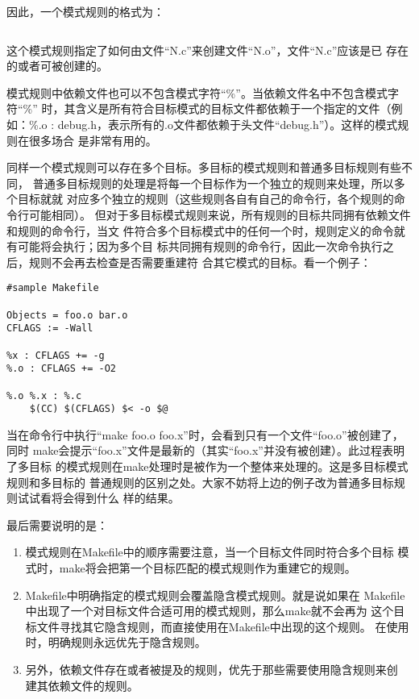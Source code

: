 因此，一个模式规则的格式为：

\begin{Verbatim}[]
%.o : %.c ; COMMAND...
\end{Verbatim}
\noindent 这个模式规则指定了如何由文件“N.c”来创建文件“N.o”，文件“N.c”应该是已
存在的或者可被创建的。

模式规则中依赖文件也可以不包含模式字符“\%”。当依赖文件名中不包含模式字符“\%”
时，其含义是所有符合目标模式的目标文件都依赖于一个指定的文件（例如：\%.o :
debug.h，表示所有的.o文件都依赖于头文件“debug.h”）。这样的模式规则在很多场合
是非常有用的。

同样一个模式规则可以存在多个目标。多目标的模式规则和普通多目标规则有些不同，
普通多目标规则的处理是将每一个目标作为一个独立的规则来处理，所以多个目标就就
对应多个独立的规则（这些规则各自有自己的命令行，各个规则的命令行可能相同）。
但对于多目标模式规则来说，所有规则的目标共同拥有依赖文件和规则的命令行，当文
件符合多个目标模式中的任何一个时，规则定义的命令就有可能将会执行；因为多个目
标共同拥有规则的命令行，因此一次命令执行之后，规则不会再去检查是否需要重建符
合其它模式的目标。看一个例子：
\begin{Verbatim}[]
#sample Makefile

Objects = foo.o bar.o
CFLAGS := -Wall

%x : CFLAGS += -g
%.o : CFLAGS += -O2

%.o %.x : %.c
    $(CC) $(CFLAGS) $< -o $@
\end{Verbatim}

当在命令行中执行“make foo.o foo.x”时，会看到只有一个文件“foo.o”被创建了，同时
make会提示“foo.x”文件是最新的（其实“foo.x”并没有被创建）。此过程表明了多目标
的模式规则在make处理时是被作为一个整体来处理的。这是多目标模式规则和多目标的
普通规则的区别之处。大家不妨将上边的例子改为普通多目标规则试试看将会得到什么
样的结果。

最后需要说明的是：

\begin{enumerate}
\itemsep=0pt \parskip=0pt
  \item 模式规则在Makefile中的顺序需要注意，当一个目标文件同时符合多个目标
      模式时，make将会把第一个目标匹配的模式规则作为重建它的规则。
  \item  Makefile中明确指定的模式规则会覆盖隐含模式规则。就是说如果在
      Makefile中出现了一个对目标文件合适可用的模式规则，那么make就不会再为
      这个目标文件寻找其它隐含规则，而直接使用在Makefile中出现的这个规则。
      在使用时，明确规则永远优先于隐含规则。
  \item 另外，依赖文件存在或者被提及的规则，优先于那些需要使用隐含规则来创
      建其依赖文件的规则。
\end{enumerate}

